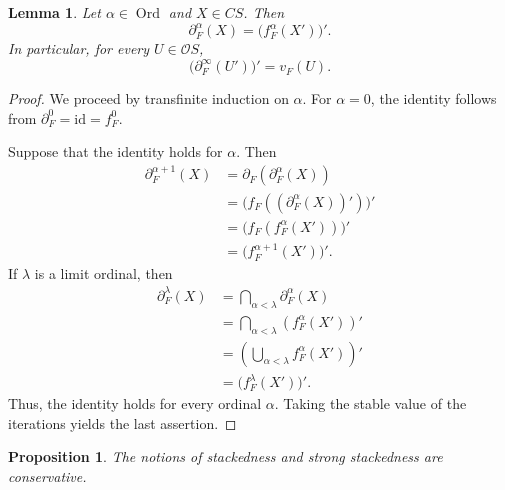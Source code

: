 \documentclass[11pt]{amsart}
\DeclareMathOperator{\Ord}{Ord}
\theoremstyle{plain}
\newtheorem{lem}[thm]{Lemma}
\newtheorem{prop}[thm]{Proposition}
\theoremstyle{definition}
\begin{document}
\begin{lem}\label{inducciontransfinita}
Let $\alpha\in \Ord$ and $X\in CS$. Then
\[
\partial_F^\alpha(X)=\big(f_F^\alpha(X')\big)'.
\]
In particular, for every \(U\in\mathcal{O}S\),
\[
    \bigl(\partial_F^\infty(U')\bigr)'=v_F(U).
\]
\end{lem}

\begin{proof}
We proceed by transfinite induction on $\alpha$.
For $\alpha=0$, the identity follows from
$\partial_F^0=\mathrm{id}=f_F^0$.

Suppose that the identity holds for $\alpha$. Then
\[
\begin{aligned}
\partial_F^{\alpha+1}(X)
 &=\partial_F(\partial_F^\alpha(X))\\
 &=\bigl(f_F((\partial_F^\alpha(X))')\bigr)'\\
 &=\bigl(f_F(f_F^\alpha(X'))\bigr)'\\
 &=\bigl(f_F^{\alpha+1}(X')\bigr)'.
\end{aligned}
\]
If $\lambda$ is a limit ordinal, then
\[
\begin{aligned}
\partial_F^\lambda(X)
 &=\bigcap_{\alpha<\lambda}\partial_F^\alpha(X)\\
 &=\bigcap_{\alpha<\lambda}(f_F^\alpha(X'))'\\
 &=\left(\bigcup_{\alpha<\lambda}
 f_F^\alpha(X')\right)'\\
 &=\bigl(f_F^\lambda(X')\bigr)'.
\end{aligned}
\]
Thus, the identity holds for every ordinal
$\alpha$. Taking the stable value of the
iterations yields the last assertion.
\end{proof}

\begin{prop}\label{apiladoconservativa}
The notions of stackedness and strong stackedness are conservative.
\end{prop}
\end{document}
